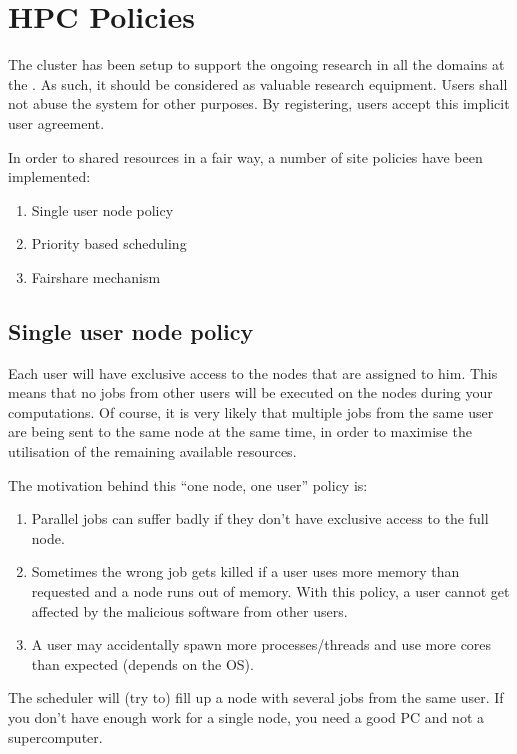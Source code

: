 \chapter{HPC Policies}
\label{ch:hpc-policies}

The cluster has been setup to support the ongoing research in all the domains
at the \university.  As such, it should be considered as
valuable research equipment.  Users shall not abuse the system for other purposes. By
registering, users accept this implicit user agreement.

In order to shared resources in a fair way, a number of site policies have been
implemented:

\begin{enumerate}
\item  Single user node policy
\item  Priority based scheduling
\item  Fairshare mechanism
\end{enumerate}


\section{Single user node policy}

Each user will have exclusive access to the nodes that are assigned to him.
This means that no jobs from other users will be executed on the nodes during
your computations.  Of course, it is very likely that multiple jobs from the
same user are being sent to the same node at the same time, in order to
maximise the utilisation of the remaining available resources.

The motivation behind this ``one node, one user'' policy is:

\begin{enumerate}
\item  Parallel jobs can suffer badly if they don't have exclusive access to the full node.
\item  Sometimes the wrong job gets killed if a user uses more memory than requested and a node runs out of memory.  With this policy, a user cannot get affected by the malicious software from other users.
\item  A user may accidentally spawn more processes/threads and use more cores than expected (depends on the OS).
\end{enumerate}

The scheduler will (try to) fill up a node with several jobs from the same
user. If you don't have enough work for a single node, you need a good PC and
not a supercomputer.



